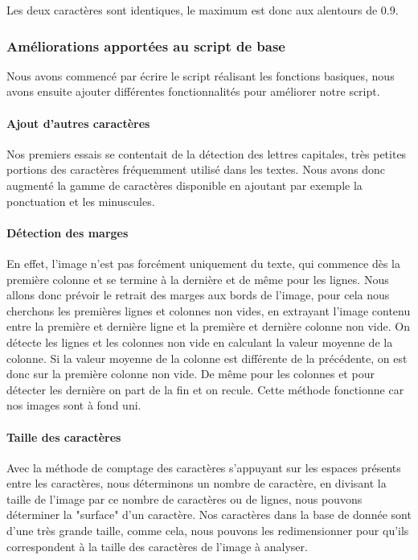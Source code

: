 \documentclass[a4paper,12pt,titlepage]{report}
\begin{document}
	Les deux caractères sont identiques, le maximum est donc aux alentours de 0.9.
	
	\subsubsection{Améliorations apportées au script de base}
	Nous avons commencé par écrire le script réalisant les fonctions basiques, nous avons ensuite ajouter différentes fonctionnalités pour améliorer notre script.
	\paragraph{Ajout d'autres caractères}
	Nos premiers essais se contentait de la détection des lettres capitales, très petites portions des caractères fréquemment utilisé dans les textes. Nous avons donc augmenté la gamme de caractères disponible en ajoutant par exemple la ponctuation et les minuscules.	
	\paragraph{Détection des marges} 
	En effet, l'image n'est pas forcément uniquement du texte, qui commence dès la première colonne et se termine à la dernière et de même pour les lignes.
	Nous allons donc prévoir le retrait des marges aux bords de l'image, pour cela nous cherchons les premières lignes et colonnes non vides, en extrayant l'image contenu entre la première et dernière ligne et la première et dernière colonne non vide. On détecte les lignes et les colonnes non vide en calculant la valeur moyenne de la colonne. Si la valeur moyenne de la colonne est différente de la précédente, on est donc sur la première colonne non vide. De même pour les colonnes et pour détecter les dernière on part de la fin et on recule.
	Cette méthode fonctionne car nos images sont à fond uni.
	\paragraph{Taille des caractères}
	Avec la méthode de comptage des caractères s'appuyant sur les espaces présents entre les caractères, nous déterminons un nombre de caractère, en divisant la taille de l'image par ce nombre de caractères ou de lignes, nous pouvons déterminer la "surface" d'un caractère. Nos caractères dans la base de donnée sont d'une très grande taille, comme cela, nous pouvons les redimensionner pour qu'ils correspondent à la taille des caractères de l'image à analyser.
\end{document}
